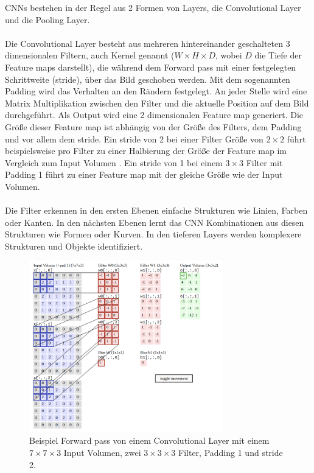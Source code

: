 \gls{CNN}s bestehen in der Regel aus 2 Formen von \gls{Layer}s, die Convolutional \gls{Layer} und die Pooling Layer. 
\\
\\
Die Convolutional \gls{Layer} besteht aus mehreren hintereinander geschalteten 3 dimensionalen
Filtern, auch Kernel genannt ($ W \times H \times D$, wobei $D$ die Tiefe der Feature maps darstellt), die während dem Forward pass mit 
einer festgelegten Schrittweite (\gls{stride}), über das Bild geschoben werden. Mit dem sogenannten Padding wird das Verhalten an den Rändern festgelegt.
An jeder Stelle wird eine Matrix Multiplikation zwischen den Filter und die aktuelle Position auf dem Bild durchgeführt. 
Als Output wird eine 2 dimensionalen Feature map generiert. Die Größe dieser Feature map ist abhängig 
von der Größe des Filters, dem Padding und vor allem dem \gls{stride}. Ein \gls{stride} von 2 bei einer Filter Größe von $ 2\times2 $ führt beispielsweise 
pro Filter zu einer Halbierung der Größe der Feature map im Vergleich zum Input Volumen \cite{aufbau-funktion-convnet}.
Ein \gls{stride} von 1 bei einem $ 3\times3 $ Filter mit Padding 1 führt zu einer Feature map mit der gleiche Größe wie der Input Volumen.
\\
\\
Die Filter erkennen in den ersten Ebenen einfache Strukturen wie Linien, Farben oder Kanten. In den nächsten Ebenen lernt das CNN Kombinationen aus 
diesen Strukturen wie Formen oder Kurven. In den tieferen \gls{Layer}s werden komplexere Strukturen und Objekte identifiziert. 

\begin{figure}[H]
  \centering
  \includegraphics[width=0.75\textwidth]{resources/cnn/funktion-cnn.png}
  \caption{
    Beispiel Forward pass von einem Convolutional \gls{Layer} mit einem $ 7\times7\times3 $ Input Volumen, zwei $3\times3\times3$ Filter, 
    Padding 1 und \gls{stride} 2.
    \cite{convnet-demo}
  }
  \label{image:convnet-demo}
\end{figure}

